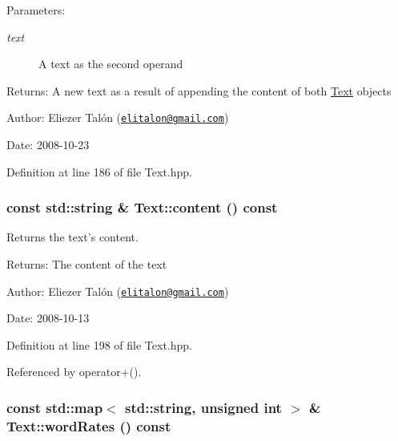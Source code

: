 \begin{Desc}
\item[Parameters:]
\begin{description}
\item[{\em text}]A text as the second operand\end{description}
\end{Desc}
\begin{Desc}
\item[Returns:]A new text as a result of appending the content of both \hyperlink{class_text}{Text} objects\end{Desc}
\begin{Desc}
\item[Author:]Eliezer Talón (\href{mailto:elitalon@gmail.com}{\tt elitalon@gmail.com}) \end{Desc}
\begin{Desc}
\item[Date:]2008-10-23 \end{Desc}


Definition at line 186 of file Text.hpp.\hypertarget{class_text_8b6ac381338c5b3f719600b5f9be222c}{
\subsubsection[content]{\setlength{\rightskip}{0pt plus 5cm}const std::string \& Text::content () const}}
\label{class_text_8b6ac381338c5b3f719600b5f9be222c}


Returns the text's content. 

\begin{Desc}
\item[Returns:]The content of the text\end{Desc}
\begin{Desc}
\item[Author:]Eliezer Talón (\href{mailto:elitalon@gmail.com}{\tt elitalon@gmail.com}) \end{Desc}
\begin{Desc}
\item[Date:]2008-10-13 \end{Desc}


Definition at line 198 of file Text.hpp.

Referenced by operator+().\hypertarget{class_text_f1588ae161a4c4894b2ce1a1d29ebc22}{
\subsubsection[wordRates]{\setlength{\rightskip}{0pt plus 5cm}const std::map$<$ std::string, unsigned int $>$ \& Text::wordRates () const}}
\label{class_text_f1588ae161a4c4894b2ce1a1d29ebc22}


